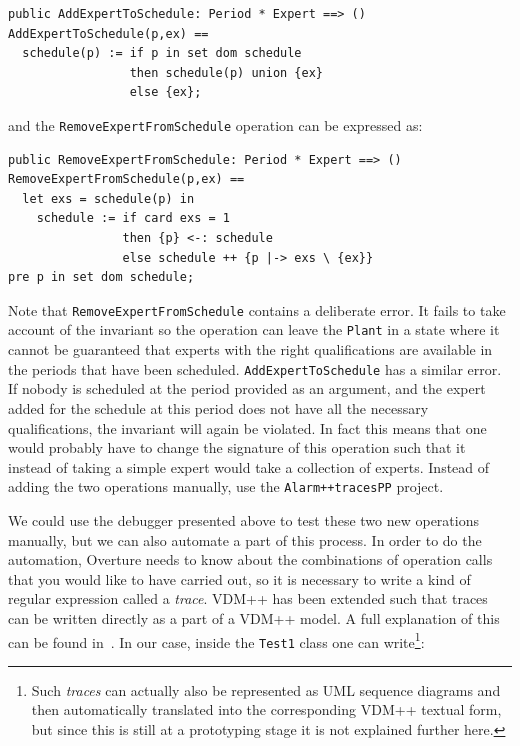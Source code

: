 \begin{lstlisting}
public AddExpertToSchedule: Period * Expert ==> ()
AddExpertToSchedule(p,ex) ==
  schedule(p) := if p in set dom schedule
                 then schedule(p) union {ex}
                 else {ex};
\end{lstlisting}

\noindent and the \texttt{RemoveExpertFromSchedule} operation can
be expressed as:

\begin{lstlisting}
public RemoveExpertFromSchedule: Period * Expert ==> ()
RemoveExpertFromSchedule(p,ex) == 
  let exs = schedule(p) in
    schedule := if card exs = 1
                then {p} <-: schedule
                else schedule ++ {p |-> exs \ {ex}}
pre p in set dom schedule;
\end{lstlisting}

\noindent Note that \texttt{RemoveExpertFromSchedule} contains a
deliberate error. It fails to take account of the invariant so the
operation can leave the \texttt{Plant} in a state where it cannot be
guaranteed that experts with the right qualifications are available in
the periods that have been scheduled. \texttt{AddExpertToSchedule} has
a similar error.  If nobody is scheduled at the period provided as an
argument, and the expert added for the schedule at this period does
not have all the necessary qualifications, the invariant will again be
violated. In fact this means that one would probably have to change
the signature of this operation such that it instead of taking a
simple expert would take a collection of experts. Instead of adding the 
two operations manually, use the \texttt{Alarm++tracesPP} project.

We could use the debugger presented above to test these two new 
operations manually, but we can also automate a part of this process.
In order to do the automation, Overture needs to know about the
combinations of operation calls that you would like to have carried
out, so it is necessary to write a kind of regular expression called a
\emph{trace}. VDM++ has been extended such that traces can be written
directly as a part of a VDM++ model. A full explanation of this can be
found in~\cite{Larsen&09d}. In our case, inside the \texttt{Test1}
class one can write\footnote{Such \emph{traces} can actually also be
  represented as UML sequence diagrams and then automatically
  translated into the corresponding VDM++ textual form, but since this
is still at a prototyping stage it is not explained further here.}:

